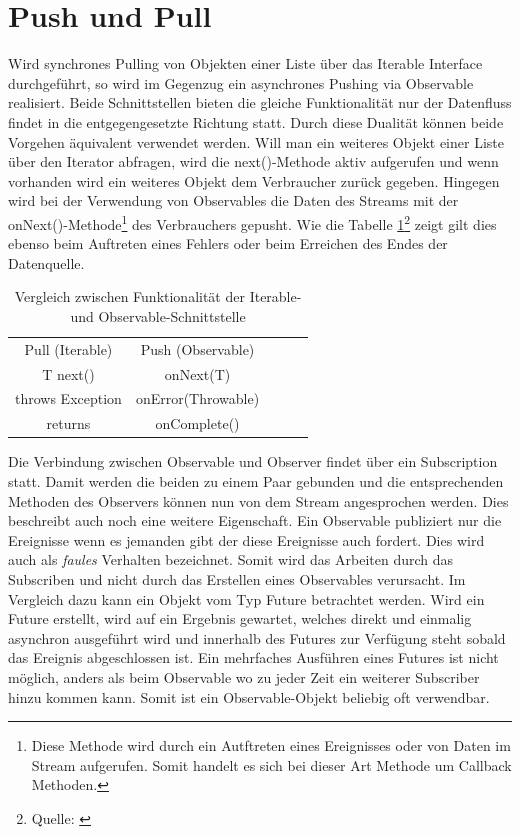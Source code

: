 \section{Push und Pull}
Wird synchrones Pulling von Objekten einer Liste über das Iterable Interface durchgeführt, so wird im Gegenzug ein asynchrones Pushing via Observable realisiert. Beide Schnittstellen bieten die gleiche Funktionalität nur der Datenfluss findet in die entgegengesetzte Richtung statt. Durch diese Dualität können beide Vorgehen äquivalent verwendet werden. Will man ein weiteres Objekt einer Liste über den Iterator abfragen, wird die next()-Methode aktiv aufgerufen und wenn vorhanden wird ein weiteres Objekt dem Verbraucher zurück gegeben. Hingegen wird bei der Verwendung von Observables die Daten des Streams mit der onNext()-Methode\footnote{Diese Methode wird durch ein Autftreten eines Ereignisses oder von Daten im Stream aufgerufen. Somit handelt es sich bei dieser Art Methode um Callback Methoden.} des Verbrauchers gepusht. Wie die Tabelle \ref{tbl:vglIterObs}\footnote{Quelle: \cite{reactivex.io}} zeigt gilt dies ebenso beim Auftreten eines Fehlers oder beim Erreichen des Endes der Datenquelle.
\begin{table}[]
	\centering
	\begin{tabular}{|c|c|lll}
		\cline{1-2}
		\cellcolor[HTML]{C0C0C0}Pull (Iterable) & \cellcolor[HTML]{C0C0C0}Push (Observable) &  &  &  \\ \cline{1-2}
		T next()                                & onNext(T)                                 &  &  &  \\ \cline{1-2}
		throws Exception                        & onError(Throwable)                        &  &  &  \\ \cline{1-2}
		returns                                 & onComplete()                             &  &  &  \\ \cline{1-2}
	\end{tabular}
	\caption{Vergleich zwischen Funktionalität der Iterable- und Observable-Schnittstelle}
	\label{tbl:vglIterObs}
\end{table}
Die Verbindung zwischen Observable und Observer findet über ein Subscription statt. Damit werden die beiden zu einem Paar gebunden und die entsprechenden Methoden des Observers können nun von dem Stream angesprochen werden. Dies beschreibt auch noch eine weitere Eigenschaft. Ein Observable publiziert nur die Ereignisse wenn es jemanden gibt der diese Ereignisse auch fordert. Dies wird auch als \textit{faules} Verhalten bezeichnet. Somit wird das Arbeiten durch das Subscriben und nicht durch das Erstellen eines Observables verursacht. Im Vergleich dazu kann ein Objekt vom Typ Future betrachtet werden. Wird ein Future erstellt, wird auf ein Ergebnis gewartet, welches direkt und einmalig asynchron ausgeführt wird und innerhalb des Futures zur Verfügung steht sobald das Ereignis abgeschlossen ist. Ein mehrfaches Ausführen eines Futures ist nicht möglich, anders als beim Observable wo zu jeder Zeit ein weiterer Subscriber hinzu kommen kann. Somit ist ein Observable-Objekt beliebig oft verwendbar. 
